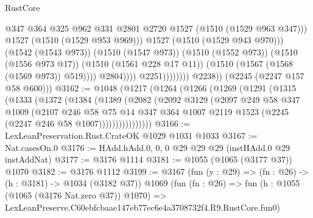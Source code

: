 \begin{lexlean}{RustCore}
\begin{coremodule}
                                            @347
                                            @364
                                            @325
                                            @962
                                            @331
                                            @2801
                                            @2720
                                            @1527
                                            (@1510 (@1529 @963 @347)))
                                          @1527
                                          (@1510 (@1529 @953 @969)))
                                        @1527
                                        (@1510 (@1529 @943 @970)))
                                      (@1542 (@1543 @973))
                                      (@1510 (@1547 @973))
                                      (@1510 (@1552 @973))
                                      (@1510 (@1556 @973 @17))
                                      (@1510 (@1561 @228 @17 @11))
                                      (@1510 (@1567 (@1568 (@1569 @973)) @519))))
                                  @2804))))
                          @2251))))))))
          @2238))
      (@2245 (@2247 @157 @58 @600)))
@3162 := @1048
    (@1217
      (@1264
        (@1266
          (@1269
            (@1291
              (@1315
                (@1333
                  (@1372
                    (@1384
                      (@1389
                        (@2082
                          (@2092
                            @3129
                            (@2097
                              @249
                              @58
                              @347
                              @1009
                              (@2107
                                @246
                                @58
                                @75
                                @14
                                @347
                                @364
                                @1007
                                @2119
                                @1523
                                (@2245 (@2247 @246 @58 @1007))))))))))))))))
@3166 := LexLeanPreservation.Rust.CrateOK @1029 @1031 @1033
@3167 := Nat.casesOn.{0}
@3176 := HAdd.hAdd.{0, 0, 0} @29 @29 @29 (instHAdd.{0} @29 instAddNat)
@3177 := @3176 @1114
@3181 := @1055 (@1065 (@3177 @37)) @1070
@3182 := @3176 @1112
@3199 := @3167
    (fun (y : @29) => (fn : @26) -> (h : @3181) -> @1034 (@3182 @37))
    @1069
    (fun (fn : @26) =>
    fun (h : @1055 (@1065 (@3176 Nat.zero @37)) @1070) =>
    LexLeanPreserve.C60ebfcbaae147eb77ec6e4a3708732f4.R9.RustCore.fun0)

\end{coremodule}
\end{lexlean}
